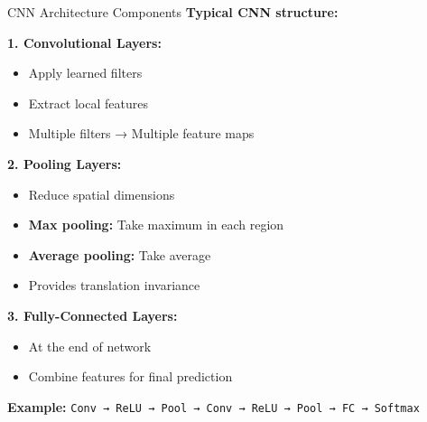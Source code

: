 \documentclass[aspectratio=169]{beamer}
\begin{document}
\begin{frame}{CNN Architecture Components}
  \textbf{Typical CNN structure:}

  \vspace{0.5em}

  \textbf{1. Convolutional Layers:}
  \begin{itemize}
    \item Apply learned filters
    \item Extract local features
    \item Multiple filters → Multiple feature maps
  \end{itemize}

  \textbf{2. Pooling Layers:}
  \begin{itemize}
    \item Reduce spatial dimensions
    \item \textbf{Max pooling:} Take maximum in each region
    \item \textbf{Average pooling:} Take average
    \item Provides translation invariance
  \end{itemize}

  \textbf{3. Fully-Connected Layers:}
  \begin{itemize}
    \item At the end of network
    \item Combine features for final prediction
  \end{itemize}

  \vspace{0.5em}

  \textbf{Example:} \texttt{Conv → ReLU → Pool → Conv → ReLU → Pool → FC → Softmax}
\end{frame}
\end{document}
